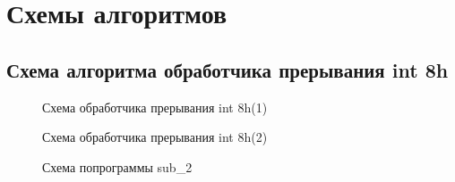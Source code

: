 \section{Схемы алгоритмов}

\subsection{Схема алгоритма обработчика прерывания int 8h}

\vfill
\begin{figure}[h]
    \centering
    \def\svgwidth{\columnwidth}
    
    \caption{Схема обработчика прерывания int 8h(1)}
\end{figure}
\vfill
\pagebreak

\vspace*{\fill}
\begin{figure}[h]
    \centering
    \def\svgwidth{\columnwidth}
    
    \caption{Схема обработчика прерывания int 8h(2)}
\end{figure}
\vfill
\pagebreak

\vspace*{\fill}
\begin{figure}[h]
    \centering
    \def\svgwidth{0.6\columnwidth}
    
    \caption{Схема попрограммы sub\_2}
\end{figure}
\vfill
\pagebreak

